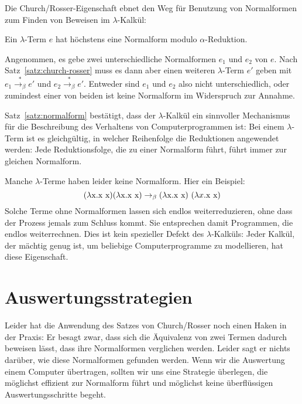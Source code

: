 Die Church/Rosser-Eigenschaft ebnet den Weg für Benutzung von
Normalformen zum Finden von Beweisen im $\lambda$-Kalkül:
%
\begin{satz}
  \label{satz:normalform}
  Ein $\lambda$-Term $e$ hat höchstens eine Normalform modulo
  $\alpha$-Reduktion.
\end{satz}
%
\begin{beweis}
  Angenommen, es gebe zwei unterschiedliche Normalformen $e_1$ und
  $e_2$ von $e$.  Nach Satz~\ref{satz:church-rosser} muss es dann
  aber einen weiteren $\lambda$-Term $e'$ geben mit   $e_1\overset{\ast}{\rightarrow_\beta} e'$ und
  $e_2\overset{\ast}{\rightarrow_\beta} e'$.  Entweder sind $e_1$ und
  $e_2$ also nicht unterschiedlich, oder zumindest einer von
  beiden ist keine Normalform im Widerspruch zur Annahme.
\end{beweis}
Satz~\ref{satz:normalform} bestätigt, dass
der $\lambda$-Kalkül ein sinnvoller Mechanismus für die Beschreibung
des Verhaltens von Computerprogrammen ist: Bei einem $\lambda$-Term
ist es gleichgültig, in welcher Reihenfolge die Reduktionen
angewendet werden: Jede Reduktionsfolge, die zu einer Normalform
führt, führt immer zur gleichen Normalform.

Manche
$\lambda$-Terme haben leider keine Normalform.  Hier ein
Beispiel:
%
\begin{displaymath}
  (\lambda \mathrm x.\mathrm x~\mathrm x)(\lambda \mathrm x.\mathrm x~\mathrm x) \rightarrow_\beta (\lambda \mathrm x.\mathrm x~\mathrm x)~(\lambda x.\mathrm x~\mathrm x)
\end{displaymath}
%
Solche Terme ohne Normalformen lassen sich endlos weiterreduzieren,
ohne dass der Prozess jemals zum Schluss kommt.  Sie entsprechen damit
Programmen, die endlos weiterrechnen.
Dies ist kein spezieller Defekt des
$\lambda$-Kalküls: Jeder Kalkül, der mächtig genug ist, um beliebige
Computerprogramme zu modellieren, hat diese Eigenschaft.

\section{Auswertungsstrategien}
\label{sec:lambda-evaluation-strategies}

Leider hat die Anwendung des Satzes von
Church/Rosser noch einen Haken in der Praxis: Er besagt zwar, dass sich
die Äquivalenz von zwei Termen dadurch beweisen lässt, dass ihre
Normalformen verglichen werden.  Leider sagt er nichts darüber,
wie diese Normalformen gefunden werden.  Wenn wir die Auswertung einem
Computer übertragen, sollten wir uns eine Strategie überlegen, die
möglichst effizient zur Normalform führt und möglichst keine
überflüssigen Auswertungsschritte begeht.

